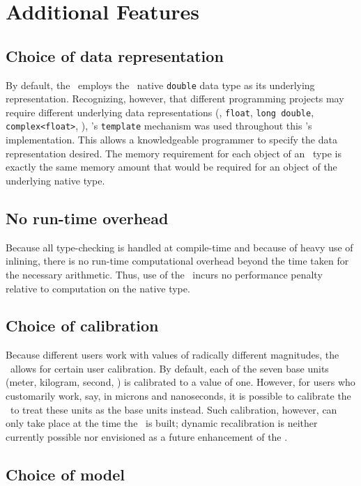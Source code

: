 \section{ Additional Features }

\subsection{ Choice of data representation }

By default, the \lib\ 
employs the \cpp\ native {\tt double}
data type as its underlying representation.
Recognizing, however, that different programming projects
may require different underlying data representations (\eg,
  {\tt float},
  {\tt long double},
  {\tt complex<float>},
\etc),
\cpp's {\tt template} mechanism
was used throughout this \lib's implementation.
This allows a knowledgeable programmer
to specify the data representation desired.
The memory requirement
for each object of an \SIlib\ type
is exactly the same memory amount
that would be required
for an object of the underlying native type.

\subsection{ No run-time overhead }

Because all type-checking is handled at compile-time
and because of heavy use of inlining,
there is no run-time computational overhead beyond the
time taken for the necessary arithmetic.
Thus, use of the \SIlib\ incurs no performance penalty
relative to computation on the native type.

\subsection{ Choice of calibration }

Because different users work
with values of radically different magnitudes,
the \SIlib\ allows for certain user calibration.
By default,
each of the seven base units
(meter, kilogram, second, \etc)
is calibrated to a value of one.
However, for users who customarily work, say,
in microns and nanoseconds,
it is possible to calibrate the \lib\ 
to treat these units as the base units instead.
Such calibration, however, can only take place
at the time the \lib\ is built;
dynamic recalibration is neither currently possible
nor envisioned as a future enhancement of the \lib.

\subsection{ Choice of model }

